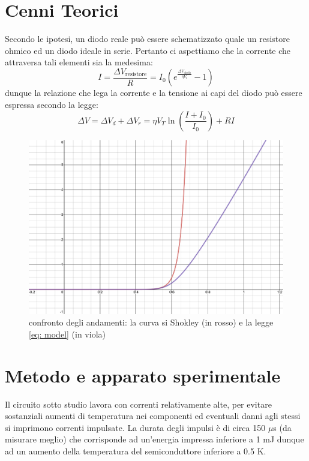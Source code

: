 \documentclass{article}[a4paper, oneside, 11pt]
\begin{document}
\section{Cenni Teorici}
Secondo le ipotesi, un diodo reale può essere schematizzato quale un resistore 
ohmico ed un diodo ideale in serie. Pertanto ci aspettiamo che la corrente che 
attraversa tali elementi sia la medesima:
\begin{equation}
	I = \frac{\Delta V_{\text{resistore}}}{R} =
	I_0 \left( e^{\frac{\Delta V_{\text{diodo}}}{\eta V_t}} - 1\right)
\end{equation}
dunque la relazione che lega la corrente e la tensione ai capi del diodo può 
essere espressa secondo la legge:
\begin{equation}\label{eq: model}
	\Delta V = \Delta V_d + \Delta V_r = \eta V_T \ln{\left(\frac{
	I+I_0}{I_0}\right)} + RI
\end{equation}
\begin{figure}[H]
	\centering 
 		\includegraphics[scale=0.25]{./confronto_curve.png}
 	\caption{confronto degli andamenti: la curva si Shokley (in rosso) e la legge \eqref{eq: model} (in viola)}
\end{figure}


\section{Metodo e apparato sperimentale}
Il circuito sotto studio lavora con correnti relativamente alte, per evitare 
sostanziali aumenti di temperatura nei componenti ed eventuali danni agli 
stessi si imprimono correnti impulsate.
La durata degli impulsi è di circa 150 $\mu$s (da misurare meglio) che 
corrisponde ad un'energia impressa inferiore a 1 mJ dunque ad un aumento della 
temperatura del semiconduttore inferiore a 0.5 K.
\end{document}
